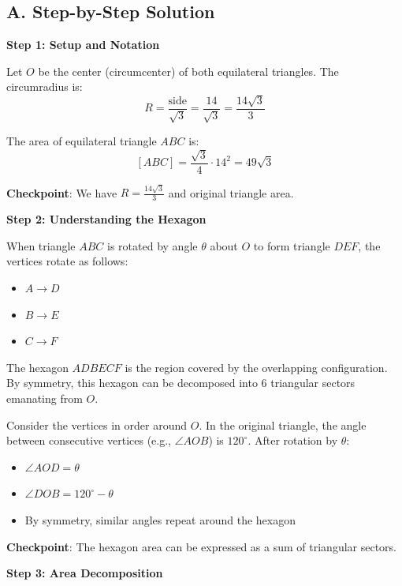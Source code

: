 \documentclass[12pt]{article}
\begin{document}
\begin{solutionbox}
\subsection*{A. Step-by-Step Solution}

\textbf{Step 1: Setup and Notation}

Let $O$ be the center (circumcenter) of both equilateral triangles. The circumradius is:
$$R = \frac{\text{side}}{\sqrt{3}} = \frac{14}{\sqrt{3}} = \frac{14\sqrt{3}}{3}$$

The area of equilateral triangle $ABC$ is:
$$[ABC] = \frac{\sqrt{3}}{4} \cdot 14^2 = 49\sqrt{3}$$

\textbf{Checkpoint}: We have $R = \frac{14\sqrt{3}}{3}$ and original triangle area.

\vspace{0.3cm}

\textbf{Step 2: Understanding the Hexagon}

When triangle $ABC$ is rotated by angle $\theta$ about $O$ to form triangle $DEF$, the vertices rotate as follows:
\begin{itemize}
    \item $A \rightarrow D$
    \item $B \rightarrow E$
    \item $C \rightarrow F$
\end{itemize}

The hexagon $ADBECF$ is the region covered by the overlapping configuration. By symmetry, this hexagon can be decomposed into 6 triangular sectors emanating from $O$.

Consider the vertices in order around $O$. In the original triangle, the angle between consecutive vertices (e.g., $\angle AOB$) is $120^{\circ}$. After rotation by $\theta$:
\begin{itemize}
    \item $\angle AOD = \theta$
    \item $\angle DOB = 120^{\circ} - \theta$
    \item By symmetry, similar angles repeat around the hexagon
\end{itemize}

\textbf{Checkpoint}: The hexagon area can be expressed as a sum of triangular sectors.

\vspace{0.3cm}

\textbf{Step 3: Area Decomposition}


\end{solutionbox}
\end{document}
